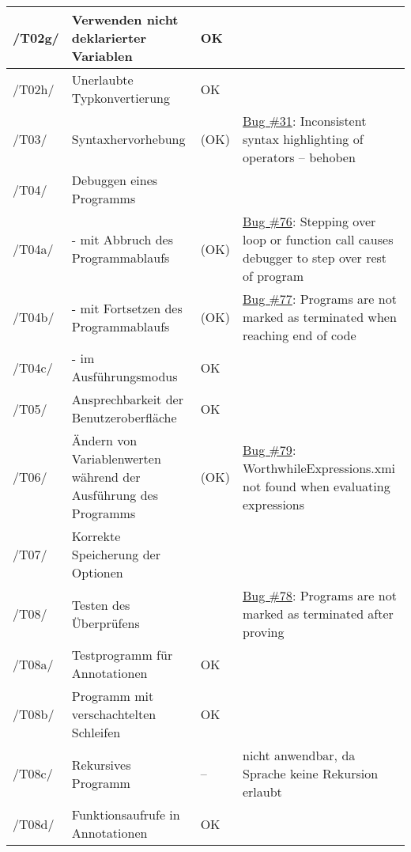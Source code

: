 \begin{landscape}
\begin{longtable}{lp{8cm}lp{10cm}}
/T02g/ & Verwenden nicht deklarierter Variablen & OK &  \\ \midrule
/T02h/ & Unerlaubte Typkonvertierung & OK &  \\ \midrule
\midrule
/T03/ & Syntaxhervorhebung & (OK) & \href{https://github.com/team-worthwhile/worthwhile/issues/31}{Bug \#31}: Inconsistent syntax highlighting of operators – behoben \\ \midrule
\midrule
/T04/ & Debuggen eines Programms &  &  \\ \midrule
/T04a/ &  - mit Abbruch des Programmablaufs & (OK) & \href{https://github.com/team-worthwhile/worthwhile/issues/76}{Bug \#76}: Stepping over loop or function call causes debugger to step over rest of program \\ \midrule
/T04b/ &  - mit Fortsetzen des Programmablaufs & (OK) & \href{https://github.com/team-worthwhile/worthwhile/issues/77}{Bug \#77}: Programs are not marked as terminated when reaching end of code \\ \midrule
/T04c/ &  - im Ausführungsmodus & OK &  \\ \midrule
\midrule
/T05/ & Ansprechbarkeit der Benutzeroberfläche & OK &  \\ \midrule
\midrule
/T06/ & Ändern von Variablenwerten während der Ausführung des Programms & (OK) & \href{https://github.com/team-worthwhile/worthwhile/issues/79}{Bug \#79}: WorthwhileExpressions.xmi not found when evaluating expressions \\ \midrule
\midrule
/T07/ & Korrekte Speicherung der Optionen &  &  \\ \midrule
\midrule
/T08/ & Testen des Überprüfens & & \href{https://github.com/team-worthwhile/worthwhile/issues/78}{Bug \#78}: Programs are not marked as terminated after proving \\ \midrule
/T08a/ & Testprogramm für Annotationen & OK &  \\ \midrule
/T08b/ & Programm mit verschachtelten Schleifen & OK &  \\ \midrule
/T08c/ & Rekursives Programm & -- & nicht anwendbar, da Sprache keine Rekursion erlaubt \\ \midrule
/T08d/ & Funktionsaufrufe in Annotationen & OK &  \\

\bottomrule
\bottomrule
\end{longtable}


\end{landscape}